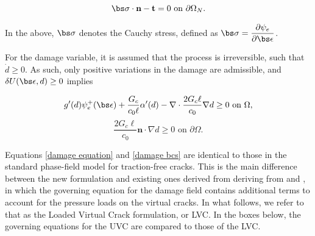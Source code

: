\begin{equation}\label{disp bcs}
    \bs\sigma \cdot \textbf{n} - \textbf{t} = 0 \text{ on }\partial\Omega_N.
\end{equation}

\noindent In the above, $\bs\sigma$ denotes the Cauchy stress, defined as $\bs\sigma = \dfrac{\partial\psi_e}{\partial \bs \epsilon}$. 

For the damage variable, it is assumed that the process is irreversible, such that $\dot{d} \ge 0$.  As such, only positive variations in the damage are admissible, and $\delta U(\bs\epsilon, d) \ge 0$ implies

\begin{equation}\label{damage equation}
    g'(d) \psi_e^+(\bs\epsilon)
    + \dfrac{G_c}{c_0\ell}\alpha'(d) - \nabla \cdot \dfrac{2G_c\ell}{c_0}\nabla d \ge 0 \text{ on }\Omega,
\end{equation}
\begin{equation}\label{damage bcs}
    \dfrac{2G_c\ell}{c_0}\textbf{n}\cdot \nabla d \ge 0 \text{ on }\partial\Omega.
\end{equation}

\noindent Equations \eqref{damage equation} and \eqref{damage bcs} are identical to those in the standard phase-field model for traction-free cracks. This is the main difference between the new formulation and existing ones derived from deriving from \cite{bourdin2012variational} and \cite{wheeler2014augmented}, in which the governing equation for the damage field contains additional terms to account for the pressure loads on the virtual cracks. In what follows, we refer to that as the Loaded Virtual Crack formulation, or LVC.  In the boxes below, the governing equations for the UVC are compared to those of the LVC.  

